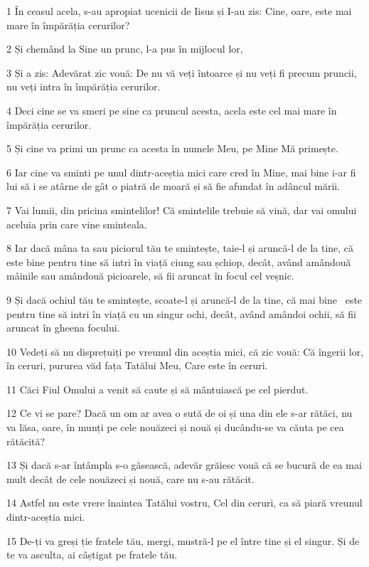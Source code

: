 \par 1 În ceasul acela, s-au apropiat ucenicii de Iisus și I-au zis: Cine, oare, este mai mare în împărăția cerurilor?
\par 2 Și chemând la Sine un prunc, l-a pus în mijlocul lor,
\par 3 Și a zis: Adevărat zic vouă: De nu vă veți întoarce și nu veți fi precum pruncii, nu veți intra în împărăția cerurilor.
\par 4 Deci cine se va smeri pe sine ca pruncul acesta, acela este cel mai mare în împărăția cerurilor.
\par 5 Și cine va primi un prunc ca acesta în numele Meu, pe Mine Mă primește.
\par 6 Iar cine va sminti pe unul dintr-aceștia mici care cred în Mine, mai bine i-ar fi lui să i se atârne de gât o piatră de moară și să fie afundat în adâncul mării.
\par 7 Vai lumii, din pricina smintelilor! Că smintelile trebuie să vină, dar vai omului aceluia prin care vine sminteala.
\par 8 Iar dacă mâna ta sau piciorul tău te smintește, taie-l și aruncă-l de la tine, că este bine pentru tine să intri în viață ciung sau șchiop, decât, având amândouă mâinile sau amândouă picioarele, să fii aruncat în focul cel veșnic.
\par 9 Și dacă ochiul tău te smintește, scoate-l și aruncă-l de la tine, că mai bine  este pentru tine să intri în viață cu un singur ochi, decât, având amândoi ochii, să fii aruncat în gheena focului.
\par 10 Vedeți să nu disprețuiți pe vreunul din aceștia mici, că zic vouă: Că îngerii lor, în ceruri, pururea văd fața Tatălui Meu, Care este în ceruri.
\par 11 Căci Fiul Omului a venit să caute și să mântuiască pe cel pierdut.
\par 12 Ce vi se pare? Dacă un om ar avea o sută de oi și una din ele s-ar rătăci, nu va lăsa, oare, în munți pe cele nouăzeci și nouă și ducându-se va căuta pe cea rătăcită?
\par 13 Și dacă s-ar întâmpla s-o găsească, adevăr grăiesc vouă că se bucură de ea mai mult decât de cele nouăzeci și nouă, care nu s-au rătăcit.
\par 14 Astfel nu este vrere înaintea Tatălui vostru, Cel din ceruri, ca să piară vreunul dintr-aceștia mici.
\par 15 De-ți va greși ție fratele tău, mergi, mustră-l pe el între tine și el singur. Și de te va asculta, ai câștigat pe fratele tău.
